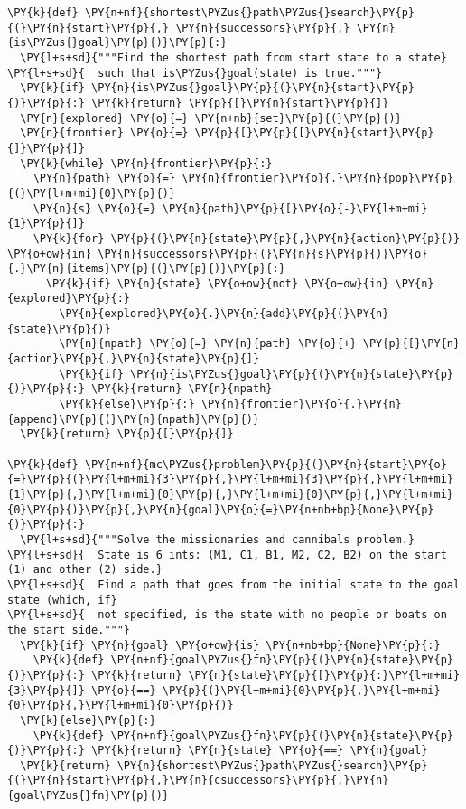 \begin{Verbatim}[commandchars=\\\{\}]
\PY{k}{def} \PY{n+nf}{shortest\PYZus{}path\PYZus{}search}\PY{p}{(}\PY{n}{start}\PY{p}{,} \PY{n}{successors}\PY{p}{,} \PY{n}{is\PYZus{}goal}\PY{p}{)}\PY{p}{:} 
  \PY{l+s+sd}{"""Find the shortest path from start state to a state}
\PY{l+s+sd}{  such that is\PYZus{}goal(state) is true."""}
  \PY{k}{if} \PY{n}{is\PYZus{}goal}\PY{p}{(}\PY{n}{start}\PY{p}{)}\PY{p}{:} \PY{k}{return} \PY{p}{[}\PY{n}{start}\PY{p}{]}
  \PY{n}{explored} \PY{o}{=} \PY{n+nb}{set}\PY{p}{(}\PY{p}{)}
  \PY{n}{frontier} \PY{o}{=} \PY{p}{[}\PY{p}{[}\PY{n}{start}\PY{p}{]}\PY{p}{]}
  \PY{k}{while} \PY{n}{frontier}\PY{p}{:}
    \PY{n}{path} \PY{o}{=} \PY{n}{frontier}\PY{o}{.}\PY{n}{pop}\PY{p}{(}\PY{l+m+mi}{0}\PY{p}{)}
    \PY{n}{s} \PY{o}{=} \PY{n}{path}\PY{p}{[}\PY{o}{-}\PY{l+m+mi}{1}\PY{p}{]}
    \PY{k}{for} \PY{p}{(}\PY{n}{state}\PY{p}{,}\PY{n}{action}\PY{p}{)} \PY{o+ow}{in} \PY{n}{successors}\PY{p}{(}\PY{n}{s}\PY{p}{)}\PY{o}{.}\PY{n}{items}\PY{p}{(}\PY{p}{)}\PY{p}{:}
      \PY{k}{if} \PY{n}{state} \PY{o+ow}{not} \PY{o+ow}{in} \PY{n}{explored}\PY{p}{:}
        \PY{n}{explored}\PY{o}{.}\PY{n}{add}\PY{p}{(}\PY{n}{state}\PY{p}{)}
        \PY{n}{npath} \PY{o}{=} \PY{n}{path} \PY{o}{+} \PY{p}{[}\PY{n}{action}\PY{p}{,}\PY{n}{state}\PY{p}{]}
        \PY{k}{if} \PY{n}{is\PYZus{}goal}\PY{p}{(}\PY{n}{state}\PY{p}{)}\PY{p}{:} \PY{k}{return} \PY{n}{npath}
        \PY{k}{else}\PY{p}{:} \PY{n}{frontier}\PY{o}{.}\PY{n}{append}\PY{p}{(}\PY{n}{npath}\PY{p}{)}
  \PY{k}{return} \PY{p}{[}\PY{p}{]}

\PY{k}{def} \PY{n+nf}{mc\PYZus{}problem}\PY{p}{(}\PY{n}{start}\PY{o}{=}\PY{p}{(}\PY{l+m+mi}{3}\PY{p}{,}\PY{l+m+mi}{3}\PY{p}{,}\PY{l+m+mi}{1}\PY{p}{,}\PY{l+m+mi}{0}\PY{p}{,}\PY{l+m+mi}{0}\PY{p}{,}\PY{l+m+mi}{0}\PY{p}{)}\PY{p}{,}\PY{n}{goal}\PY{o}{=}\PY{n+nb+bp}{None}\PY{p}{)}\PY{p}{:}
  \PY{l+s+sd}{"""Solve the missionaries and cannibals problem.}
\PY{l+s+sd}{  State is 6 ints: (M1, C1, B1, M2, C2, B2) on the start (1) and other (2) side.}
\PY{l+s+sd}{  Find a path that goes from the initial state to the goal state (which, if}
\PY{l+s+sd}{  not specified, is the state with no people or boats on the start side."""}
  \PY{k}{if} \PY{n}{goal} \PY{o+ow}{is} \PY{n+nb+bp}{None}\PY{p}{:}
    \PY{k}{def} \PY{n+nf}{goal\PYZus{}fn}\PY{p}{(}\PY{n}{state}\PY{p}{)}\PY{p}{:} \PY{k}{return} \PY{n}{state}\PY{p}{[}\PY{p}{:}\PY{l+m+mi}{3}\PY{p}{]} \PY{o}{==} \PY{p}{(}\PY{l+m+mi}{0}\PY{p}{,}\PY{l+m+mi}{0}\PY{p}{,}\PY{l+m+mi}{0}\PY{p}{)}     
  \PY{k}{else}\PY{p}{:}
    \PY{k}{def} \PY{n+nf}{goal\PYZus{}fn}\PY{p}{(}\PY{n}{state}\PY{p}{)}\PY{p}{:} \PY{k}{return} \PY{n}{state} \PY{o}{==} \PY{n}{goal}
  \PY{k}{return} \PY{n}{shortest\PYZus{}path\PYZus{}search}\PY{p}{(}\PY{n}{start}\PY{p}{,}\PY{n}{csuccessors}\PY{p}{,}\PY{n}{goal\PYZus{}fn}\PY{p}{)}


\end{Verbatim}
